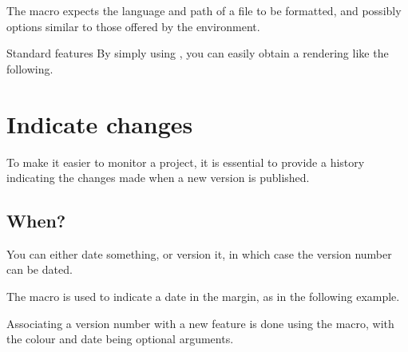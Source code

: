 The  macro expects the language and path of a file to be formatted, and possibly options similar to those offered by the  environment.


\begin{tdocexa}{Standard features}
	By simply using , you can easily obtain a rendering like the following.

\end{tdocexa}


\begin{tdocexa}
	\leavevmode
\end{tdocexa}


\section{Indicate changes}
\label{tutodoc-changes}

To make it easier to monitor a project, it is essential to provide a history indicating the changes made when a new version is published.



\subsection{When?}
\label{tutodoc-changes-when}

You can either date something, or version it, in which case the version number can be dated.




\begin{tdocexa}
    The  macro is used to indicate a date in the margin, as in the following example.

\end{tdocexa}




\begin{tdocexa}
    Associating a version number with a new feature is done using the  macro, with the colour and date being optional arguments.

\end{tdocexa}


